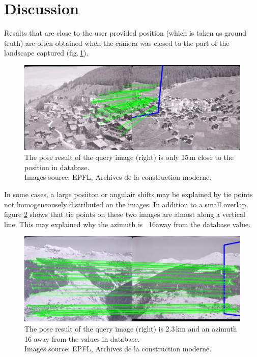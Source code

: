 \documentclass[fleqn,10pt]{wlpeerj} %
\begin{document}
\section*{Discussion}
Results that are close to the user provided position (which is taken as ground truth) 
are often obtained when the camera was closed to the part of the landscape 
captured (fig.\,\ref{ex1}).

\begin{figure}[H]
\centering
\includegraphics[width=0.8\linewidth]{ex1.jpg}
\caption[These two images show a pose result that is 15\,m to the position in database.]
{The pose result of the query image (right) is only 15\,m close to the position in database.\\
Images source: EPFL, Archives de la construction moderne.}
\label{ex1}
\end{figure}


In some cases, a large posiiton or angulair shifts may be explained by tie points 
not homogeneousely distributed on the images. In addition to a small overlap,
figure \ref{ex3} shows that tie points on these two images are almost along a 
vertical line. This may explained why the azimuth is ~16\textdegree away from the
database value.


\begin{figure}[H]
\centering
\includegraphics[width=0.8\linewidth]{ex3.jpg}
\caption[These two images show a pose result that is 2.3\,km and an azimuth that is 16\textdegree 
away from the position in database.]
{The pose result of the query image (right) is 2.3\,km and an azimuth 16\textdegree 
away from the values in database. \\
Images source: EPFL, Archives de la construction moderne.}
\label{ex3}
\end{figure}
\end{document}
